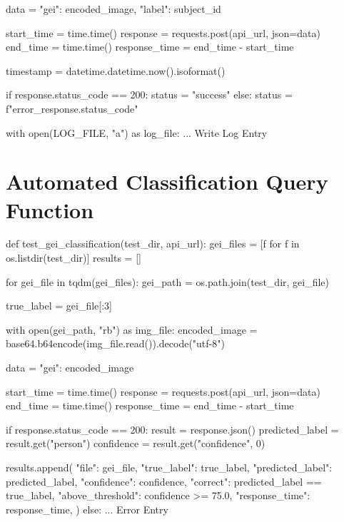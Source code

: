 \begin{appendices}
\begin{code}
        data = {"gei": encoded_image, "label": subject_id}

        start_time = time.time()
        response = requests.post(api_url, json=data)
        end_time = time.time()
        response_time = end_time - start_time

        timestamp = datetime.datetime.now().isoformat()

        if response.status_code == 200:
            status = "success"
        else:
            status = f"error_{response.status_code}"

        with open(LOG_FILE, "a") as log_file:
            ... Write Log Entry
    \end{code}

    \section{Automated Classification Query Function}
    \label{app:gait-recognition-server-testing-function}

    \begin{code}
def test_gei_classification(test_dir, api_url):
    gei_files = [f for f in os.listdir(test_dir)]
    results = []

    for gei_file in tqdm(gei_files):
        gei_path = os.path.join(test_dir, gei_file)

        true_label = gei_file[:3]

        with open(gei_path, "rb") as img_file:
            encoded_image = base64.b64encode(img_file.read()).decode("utf-8")

        data = {"gei": encoded_image}

        start_time = time.time()
        response = requests.post(api_url, json=data)
        end_time = time.time()
        response_time = end_time - start_time

        if response.status_code == 200:
            result = response.json()
            predicted_label = result.get("person")
            confidence = result.get("confidence", 0)

            results.append(
                {
                    "file": gei_file,
                    "true_label": true_label,
                    "predicted_label": predicted_label,
                    "confidence": confidence,
                    "correct": predicted_label == true_label,
                    "above_threshold": confidence >= 75.0,
                    "response_time": response_time,
                }
            )
        else:
            ... Error Entry


\end{code}
\end{appendices}
